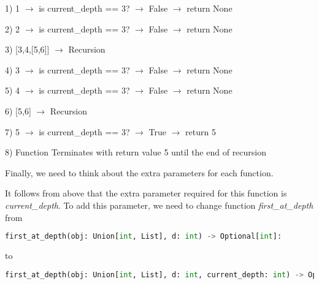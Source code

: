 \documentclass[12pt]{article}
\begin{document}
\begin{enumerate}[a.]
    \begin{mdframed}

        1) 1 $\to$ is current\_depth == 3? $\to$ False $\to$ return None

        2) 2 $\to$ is current\_depth == 3? $\to$ False $\to$ return None

        3) [3,4,[5,6]] $\to$ Recursion

        \bigskip

        \hspace{10mm} 4) 3 $\to$ is current\_depth == 3? $\to$ False $\to$ return None

        \hspace{10mm} 5) 4 $\to$ is current\_depth == 3? $\to$ False $\to$ return None

        \hspace{10mm} 6) [5,6] $\to$ Recursion

        \bigskip

        \hspace{10mm} \hspace{10mm} 7) 5 $\to$ is current\_depth == 3? $\to$ True $\to$ return 5

        \bigskip

        8) Function Terminates with return value 5 until the end of recursion

    \end{mdframed}

    \bigskip

    Finally, we need to think about the extra parameters for each function.

    \bigskip

    It follows from above that the extra parameter required for this function is
    \textit{current\_depth}. To add this parameter, we need to change function
    \textit{first\_at\_depth} from

    \begin{lstlisting}[language=python,keepspaces=false]
    first_at_depth(obj: Union[int, List], d: int) -> Optional[int]:
    \end{lstlisting}

    to

    \begin{lstlisting}[language=python,keepspaces=false]
    first_at_depth(obj: Union[int, List], d: int, current_depth: int) -> Optional[int]:
    \end{lstlisting}

    \bigskip


\end{enumerate}
\end{document}
